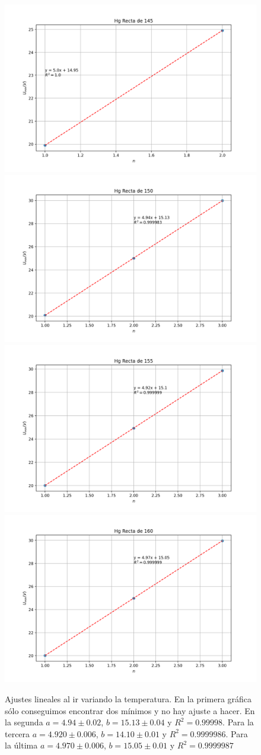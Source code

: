 \documentclass{article}
\begin{document}
\begin{figure}[h!]
\begin{center}
\includegraphics[max width=0.49\linewidth]{Hg Recta de 145}
\includegraphics[max width=0.49\linewidth]{Hg Recta de 150}
\includegraphics[max width=0.49\linewidth]{Hg Recta de 155}
\includegraphics[max width=0.49\linewidth]{Hg Recta de 160}
\caption{Ajustes lineales al ir variando la temperatura. En la primera gráfica sólo conseguimos encontrar dos mínimos y no hay ajuste a hacer. En la segunda $a = 4.94 \pm 0.02$, $b = 15.13 \pm 0.04$ y $R^2 = 0.99998$. Para la tercera $a = 4.920 \pm 0.006$, $b = 14.10 \pm 0.01$ y $R^2 = 0.9999986$. Para la última $a = 4.970 \pm 0.006$, $b = 15.05 \pm 0.01$ y $R^2 = 0.9999987$}
\label{fig:rectTemp}
\end{center}
\end{figure}
\end{document}

